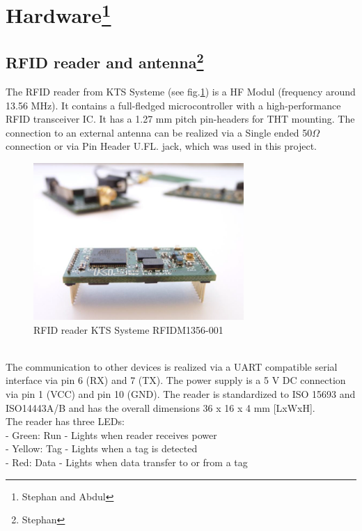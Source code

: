 \section[Hardware]{Hardware\footnote{Stephan and Abdul}}\label{Sec_Har}

\subsection[RFID reader and antenna]{RFID reader and antenna\footnote{Stephan}}
The RFID reader from KTS Systeme (see fig.\ref{Reader}) is a HF Modul (frequency around 13.56 MHz). It contains a full-fledged microcontroller with a high-performance RFID transceiver IC. It has a 1.27 mm pitch pin-headers for THT mounting. The connection to an external antenna can be realized via a Single ended 50$\Omega$ connection or via Pin Header U.FL. jack, which was used in this project. \\
\begin{figure}[!htbp]
\centering
\includegraphics[width = 8cm]{Pictures/Reader}
\caption{RFID reader KTS Systeme RFIDM1356-001}
\label{Reader}
\end{figure}\\
The communication to other devices is realized via a UART compatible serial interface via pin 6 (RX) and 7 (TX). The power supply is a 5 V DC connection via pin 1 (VCC) and pin 10 (GND). The reader is standardized to ISO 15693 and ISO14443A/B and has the overall dimensions 36 x 16 x 4 mm [LxWxH]\cite{KTSSysteme.2017}.\\
The reader has three LEDs:\\
- Green: Run - Lights when reader receives power\\
- Yellow: Tag - Lights when a tag is detected\\
- Red: Data - Lights when data transfer to or from a tag\\
